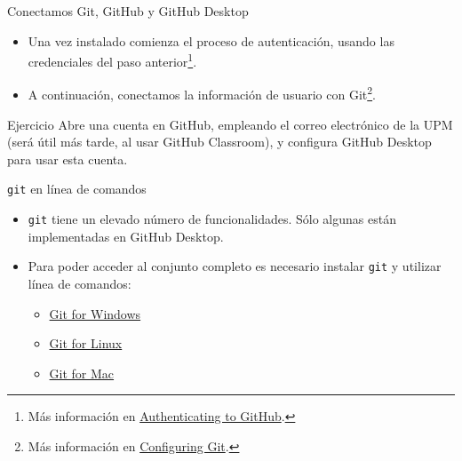 \documentclass[aspectratio=169, xcolor={usenames,svgnames,dvipsnames}]{beamer}
\begin{document}
\begin{frame}[label={sec:org0dbff69}]{Conectamos Git, GitHub y GitHub Desktop}
\begin{itemize}
\item Una vez instalado comienza el proceso de autenticación, usando las credenciales del paso anterior\footnote{Más información en \href{https://help.github.com/desktop/guides/getting-started-with-github-desktop/authenticating-to-github/}{Authenticating to GitHub}.}.
\end{itemize}

\begin{center}
\end{center}


\begin{itemize}
\item A continuación, conectamos la información de usuario con Git\footnote{Más información en \href{https://help.github.com/desktop/guides/getting-started-with-github-desktop/configuring-git-for-github-desktop/}{Configuring Git}.}.
\end{itemize}

\begin{center}
\end{center}
\end{frame}

\begin{frame}[label={sec:orge08a4ce}]{}
\begin{block}{Ejercicio}
Abre una cuenta en GitHub, empleando el correo electrónico de la UPM (será útil más tarde, al usar GitHub Classroom), y configura GitHub Desktop para usar esta cuenta.
\end{block}
\end{frame}

\begin{frame}[label={sec:orgf81053c},fragile]{\texttt{git} en línea de comandos}
 \begin{itemize}
\item \texttt{git} tiene un elevado número de funcionalidades. Sólo algunas están implementadas en GitHub Desktop.
\item Para poder acceder al conjunto completo es necesario instalar \texttt{git} y utilizar línea de comandos:
\begin{itemize}
\item \href{https://gitforwindows.org/}{Git for Windows}
\item \href{http://git-scm.com/download/linux}{Git for Linux}
\item \href{http://git-scm.com/download/mac}{Git for Mac}
\end{itemize}
\end{itemize}
\end{frame}
\end{document}
